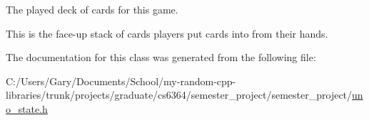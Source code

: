 \-The played deck of cards for this game. 

\-This is the face-\/up stack of cards players put cards into from their hands. 

\-The documentation for this class was generated from the following file\-:\begin{DoxyCompactItemize}
\item 
\-C\-:/\-Users/\-Gary/\-Documents/\-School/my-\/random-\/cpp-\/libraries/trunk/projects/graduate/cs6364/semester\-\_\-project/semester\-\_\-project/\hyperlink{uno__state_8h}{uno\-\_\-state.\-h}\end{DoxyCompactItemize}
